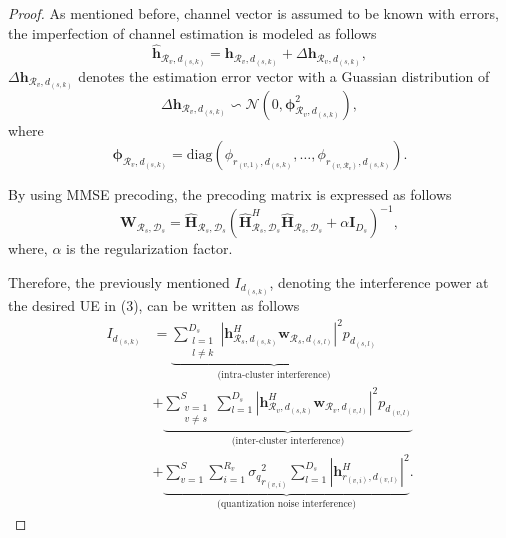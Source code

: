 \documentclass[conference,10pt,twocolumn,letter]{IEEEtran}
\begin{document}
\begin{proof}
As mentioned before, channel vector is assumed to be known with errors, the imperfection of channel estimation is modeled as follows
\begin{equation*}
\hat{\boldsymbol{h}}_{\mathcal{R}_v,d_{(s,k)}} = \boldsymbol{h}_{\mathcal{R}_v,d_{(s,k)}} + \Delta \boldsymbol{h}_{\mathcal{R}_v,d_{(s,k)}},
\end{equation*}
$\Delta \boldsymbol{h}_{\mathcal{R}_v,d_{(s,k)}}$ denotes the estimation error vector with a Guassian distribution of
$$\Delta \boldsymbol{h}_{\mathcal{R}_v,d_{(s,k)}}\backsim \mathcal{N}(0,\boldsymbol{\phi}_{\mathcal{R}_v,d_{(s,k)}}^2),$$
where 
$$\boldsymbol{\phi}_{\mathcal{R}_v,d_{(s,k)}} = \text{diag}(\phi_{r_{(v,1)},d_{(s,k)}},\ldots,\phi_{r_{(v,\mathcal{R}_v)},d_{(s,k)}}).$$


By using MMSE precoding, the precoding matrix is expressed as follows
\begin{equation}
\boldsymbol{W}_{\mathcal{R}_s,\mathcal{D}_s} = \hat{\boldsymbol{H}}_{\mathcal{R}_s,\mathcal{D}_s}(\hat{\boldsymbol{H}}_{\mathcal{R}_s,\mathcal{D}_s}^H \hat{\boldsymbol{H}}_{\mathcal{R}_s,\mathcal{D}_s}+ \alpha \boldsymbol{I}_{{D}_s})^{-1},
\end{equation} 
where, $\alpha$ is the regularization factor.


Therefore, the previously mentioned $I_{d_{(s,k)}}$, denoting the interference power at the desired UE in (3), can be written as follows
\begin{equation}\label{6}
\begin{split}
I_{d_{(s,k)}} &=  \underbrace{\sum_{\substack{l=1 \\ l\neq k}}^{{D}_s} |\boldsymbol{h}_{\mathcal{R}_s, d_{(s,k)}}^H \boldsymbol{w}_{\mathcal{R}_{s},d_{(s,l)}}|^2  p_{d_{(s,l)}}}_{\text{(intra-cluster interference)}}\\
&+\underbrace{\sum_{\substack{v=1 \\ v\neq s}}^{S} \sum_{l=1}^{{D}_s} |\boldsymbol{h}_{\mathcal{R}_v, d_{(s,k)}}^H \boldsymbol{w}_{\mathcal{R}_{v},d_{(v,l)}}|^2 p_{d_{(v,l)}}}_{\text{(inter-cluster interference)}}\\
& +\underbrace{ \sum_{v=1}^{S} \sum_{i=1}^{{R}_v} {\sigma_q}_{r_{(v,i)}}^2 \sum_{l=1}^{{D}_s} |\boldsymbol{h}_{r_{(v,i)}, d_{(v,l)}}^H|^2 }_{\text{(quantization noise interference)}}.
\end{split}
\end{equation}

 \end{proof}
\end{document}
